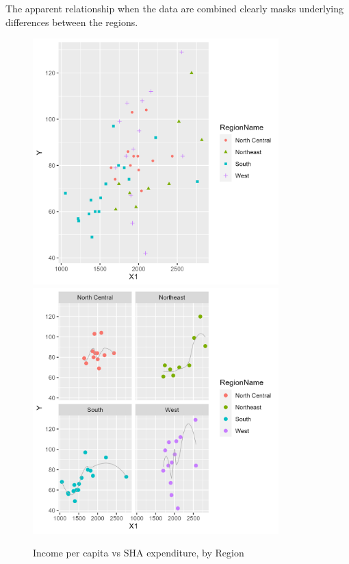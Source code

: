 \documentclass[12pt,letterpaper]{article}
\begin{document}
\begin{itemize}
    The apparent relationship when the data are combined clearly masks underlying differences
    between the regions.

    \begin{figure}
      \includegraphics[width=9.5cm]{y_x1_region.png}
    	\includegraphics[width=9.5cm]{y_x1_region_facet.png}
      \caption{Income per capita vs SHA expenditure, by Region}\label{x1_regions}
    \end{figure}

	\end{itemize}

\clearpage	
\newpage

  
\end{document}
